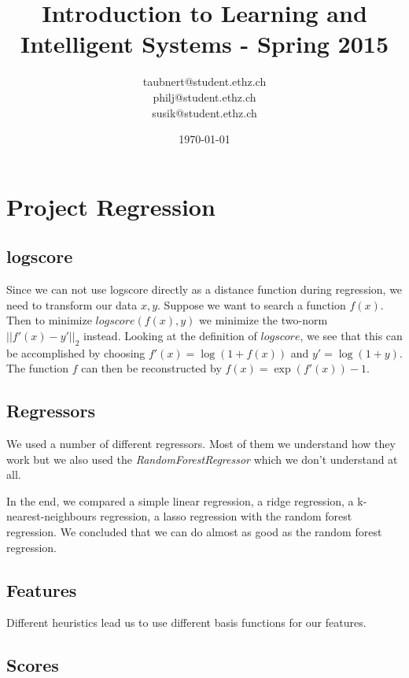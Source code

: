 \documentclass[a4paper, 11pt]{article}
\title{Introduction to Learning and Intelligent Systems - Spring 2015}
\author{taubnert@student.ethz.ch\\ philj@student.ethz.ch\\ susik@student.ethz.ch\\}
\date{\today}
\begin{document}
\maketitle

\section{Project Regression}



\subsection{logscore}
Since we can not use logscore directly as a distance function during regression,
we need to transform our data $x,y$.
Suppose we want to search a function $f(x)$.
Then to minimize $logscore(f(x),y)$ we minimize the two-norm $||f'(x) - y'||_2$ instead.
Looking at the definition of $logscore$, we see that this can be accomplished by choosing $f'(x) = \log(1 + f(x))$ and $y' = \log(1 + y)$.
The function $f$ can then be reconstructed by $f(x) = \exp(f'(x)) - 1$.

\subsection{Regressors}
We used a number of different regressors.
Most of them we understand how they work but we also used the \emph{RandomForestRegressor} which we don't understand at all.

In the end, we compared a simple linear regression, a ridge regression, a k-nearest-neighbours regression, a lasso regression with the random forest regression.
We concluded that we can do almost as good as the random forest regression.

\subsection{Features}
Different heuristics lead us to use different basis functions for our features.


\subsection{Scores}



\end{document}
